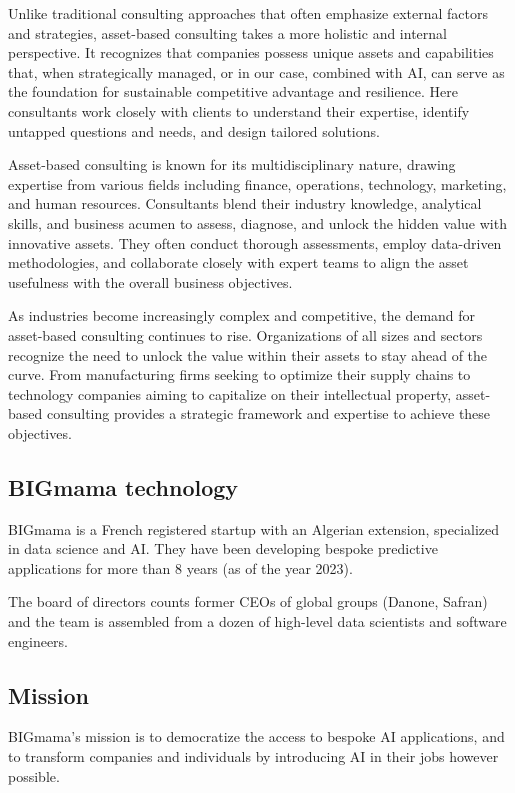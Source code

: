 \documentclass[a4paper,12pt]{article}
\begin{document}
Unlike traditional consulting approaches that often emphasize external factors and strategies, asset-based consulting takes a more holistic and internal perspective. It recognizes that companies possess unique assets and capabilities that, when strategically managed, or in our case, combined with AI, can serve as the foundation for sustainable competitive advantage and resilience. Here consultants work closely with clients to understand their expertise, identify untapped questions and needs, and design tailored solutions.

Asset-based consulting is known for its multidisciplinary nature, drawing expertise from various fields including finance, operations, technology, marketing, and human resources. Consultants blend their industry knowledge, analytical skills, and business acumen to assess, diagnose, and unlock the hidden value with innovative assets. They often conduct thorough assessments, employ data-driven methodologies, and collaborate closely with expert teams to align the asset usefulness with the overall business objectives.

As industries become increasingly complex and competitive, the demand for asset-based consulting continues to rise. Organizations of all sizes and sectors recognize the need to unlock the value within their assets to stay ahead of the curve. From manufacturing firms seeking to optimize their supply chains to technology companies aiming to capitalize on their intellectual property, asset-based consulting provides a strategic framework and expertise to achieve these objectives.

\subsection{BIGmama technology}
BIGmama is a French registered startup with an Algerian extension, specialized in data science and AI. 
They have been developing bespoke predictive applications for more than 8 years (as of the year 2023).

The board of directors counts former CEOs of global groups (Danone, Safran) and the team is assembled from a dozen of high-level data scientists and software engineers.

\subsection{Mission}
BIGmama's mission is to democratize the access to bespoke AI applications, and to transform companies and individuals by introducing AI in their jobs however possible. 
\end{document}

